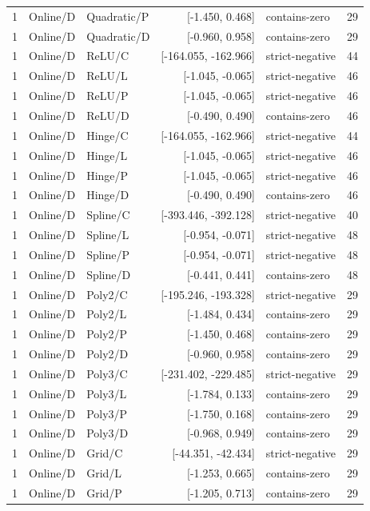 \begin{longtable}{lllrlr}
1 & Online/D & Quadratic/P & [-1.450, 0.468] & contains-zero & 29 \\
1 & Online/D & Quadratic/D & [-0.960, 0.958] & contains-zero & 29 \\
1 & Online/D & ReLU/C & [-164.055, -162.966] & strict-negative & 44 \\
1 & Online/D & ReLU/L & [-1.045, -0.065] & strict-negative & 46 \\
1 & Online/D & ReLU/P & [-1.045, -0.065] & strict-negative & 46 \\
1 & Online/D & ReLU/D & [-0.490, 0.490] & contains-zero & 46 \\
1 & Online/D & Hinge/C & [-164.055, -162.966] & strict-negative & 44 \\
1 & Online/D & Hinge/L & [-1.045, -0.065] & strict-negative & 46 \\
1 & Online/D & Hinge/P & [-1.045, -0.065] & strict-negative & 46 \\
1 & Online/D & Hinge/D & [-0.490, 0.490] & contains-zero & 46 \\
1 & Online/D & Spline/C & [-393.446, -392.128] & strict-negative & 40 \\
1 & Online/D & Spline/L & [-0.954, -0.071] & strict-negative & 48 \\
1 & Online/D & Spline/P & [-0.954, -0.071] & strict-negative & 48 \\
1 & Online/D & Spline/D & [-0.441, 0.441] & contains-zero & 48 \\
1 & Online/D & Poly2/C & [-195.246, -193.328] & strict-negative & 29 \\
1 & Online/D & Poly2/L & [-1.484, 0.434] & contains-zero & 29 \\
1 & Online/D & Poly2/P & [-1.450, 0.468] & contains-zero & 29 \\
1 & Online/D & Poly2/D & [-0.960, 0.958] & contains-zero & 29 \\
1 & Online/D & Poly3/C & [-231.402, -229.485] & strict-negative & 29 \\
1 & Online/D & Poly3/L & [-1.784, 0.133] & contains-zero & 29 \\
1 & Online/D & Poly3/P & [-1.750, 0.168] & contains-zero & 29 \\
1 & Online/D & Poly3/D & [-0.968, 0.949] & contains-zero & 29 \\
1 & Online/D & Grid/C & [-44.351, -42.434] & strict-negative & 29 \\
1 & Online/D & Grid/L & [-1.253, 0.665] & contains-zero & 29 \\
1 & Online/D & Grid/P & [-1.205, 0.713] & contains-zero & 29 \\

\end{longtable}
